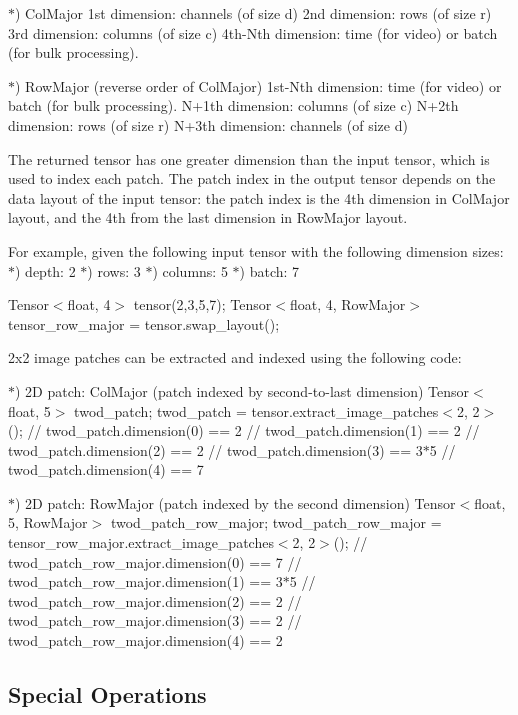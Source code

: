 $\ast$) Col\+Major 1st dimension\+: channels (of size d) 2nd dimension\+: rows (of size r) 3rd dimension\+: columns (of size c) 4th-\/\+Nth dimension\+: time (for video) or batch (for bulk processing).

$\ast$) Row\+Major (reverse order of Col\+Major) 1st-\/\+Nth dimension\+: time (for video) or batch (for bulk processing). N+1\textquotesingle{}th dimension\+: columns (of size c) N+2\textquotesingle{}th dimension\+: rows (of size r) N+3\textquotesingle{}th dimension\+: channels (of size d)

The returned tensor has one greater dimension than the input tensor, which is used to index each patch. The patch index in the output tensor depends on the data layout of the input tensor\+: the patch index is the 4\textquotesingle{}th dimension in Col\+Major layout, and the 4\textquotesingle{}th from the last dimension in Row\+Major layout.

For example, given the following input tensor with the following dimension sizes\+: $\ast$) depth\+: 2 $\ast$) rows\+: 3 $\ast$) columns\+: 5 $\ast$) batch\+: 7

Tensor$<$float, 4$>$ tensor(2,3,5,7); Tensor$<$float, 4, Row\+Major$>$ tensor\+\_\+row\+\_\+major = tensor.\+swap\+\_\+layout();

2x2 image patches can be extracted and indexed using the following code\+:

$\ast$) 2D patch\+: Col\+Major (patch indexed by second-\/to-\/last dimension) Tensor$<$float, 5$>$ twod\+\_\+patch; twod\+\_\+patch = tensor.\+extract\+\_\+image\+\_\+patches$<$2, 2$>$(); // twod\+\_\+patch.\+dimension(0) == 2 // twod\+\_\+patch.\+dimension(1) == 2 // twod\+\_\+patch.\+dimension(2) == 2 // twod\+\_\+patch.\+dimension(3) == 3$\ast$5 // twod\+\_\+patch.\+dimension(4) == 7

$\ast$) 2D patch\+: Row\+Major (patch indexed by the second dimension) Tensor$<$float, 5, Row\+Major$>$ twod\+\_\+patch\+\_\+row\+\_\+major; twod\+\_\+patch\+\_\+row\+\_\+major = tensor\+\_\+row\+\_\+major.\+extract\+\_\+image\+\_\+patches$<$2, 2$>$(); // twod\+\_\+patch\+\_\+row\+\_\+major.\+dimension(0) == 7 // twod\+\_\+patch\+\_\+row\+\_\+major.\+dimension(1) == 3$\ast$5 // twod\+\_\+patch\+\_\+row\+\_\+major.\+dimension(2) == 2 // twod\+\_\+patch\+\_\+row\+\_\+major.\+dimension(3) == 2 // twod\+\_\+patch\+\_\+row\+\_\+major.\+dimension(4) == 2

\subsection*{Special Operations}

